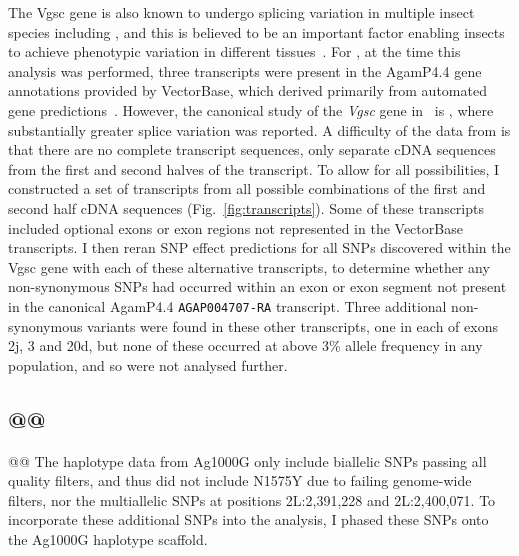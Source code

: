 \documentclass[a4paper,11pt,abstracton,hidelinks]{scrartcl}
\begin{document}
The Vgsc gene is also known to undergo splicing variation in multiple insect species including \agam, and this is believed to be an important factor enabling insects to achieve phenotypic variation in different tissues~\parencite{Dong2014,Davies2007}.
%
For \agam, at the time this analysis was performed, three transcripts were present in the AgamP4.4 gene annotations provided by VectorBase, which derived primarily from automated gene predictions~\parencite{Curwen2004}.
%
However, the canonical study of the \textit{Vgsc} gene in \agam\ is \textcite{Davies2007}, where substantially greater splice variation was reported.
%
A difficulty of the data from \textcite{Davies2007} is that there are no complete transcript sequences, only separate cDNA sequences from the first and second halves of the transcript.
%
To allow for all possibilities, I constructed a set of transcripts from all possible combinations of the first and second half cDNA sequences (Fig.~\ref{fig:transcripts}).
%
Some of these transcripts included optional exons or exon regions not represented in the VectorBase transcripts.
%
I then reran SNP effect predictions for all SNPs discovered within the Vgsc gene with each of these alternative transcripts, to determine whether any non-synonymous SNPs had occurred within an exon or exon segment not present in the canonical AgamP4.4 \texttt{AGAP004707-RA} transcript.
%
Three additional non-synonymous variants were found in these other transcripts, one in each of exons 2j, 3 and 20d, but none of these occurred at above 3\% allele frequency in any population, and so were not analysed further.


\subsection{@@}\label{subsec:methods-@@}


@@
The haplotype data from Ag1000G only include biallelic SNPs passing all quality filters, and thus did not include N1575Y due to failing genome-wide filters, nor the multiallelic SNPs at positions 2L:2,391,228 and 2L:2,400,071. To incorporate these additional SNPs into the analysis, I phased these SNPs onto the Ag1000G haplotype scaffold.


\printbibliography


\clearpage
\beginsupplement
\end{document}
